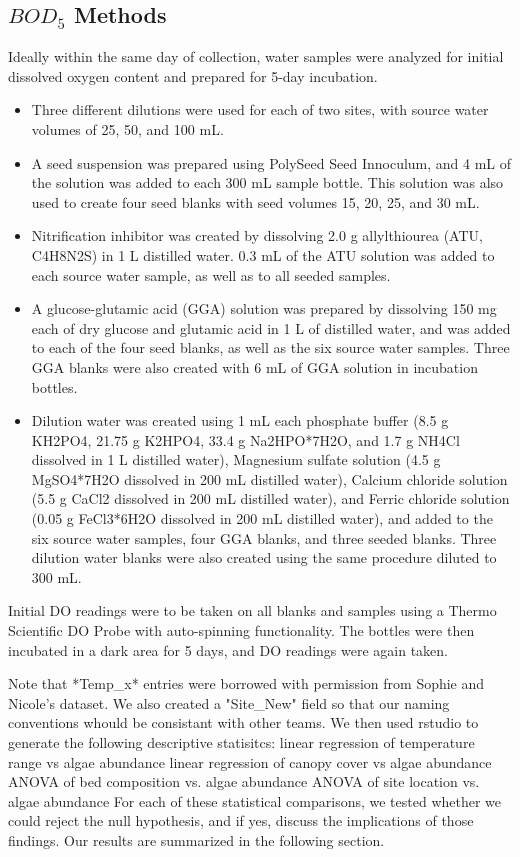 \documentclass{article}\usepackage[]{graphicx}\usepackage[]{color}
\begin{document}
\subsection{$BOD_5$ Methods}

Ideally within the same day of collection, water samples were analyzed for initial dissolved oxygen content and prepared for 5-day incubation.  
\begin{itemize}
  \item Three different dilutions were used for each of two sites, with source water volumes of 25, 50, and 100 mL. 
  \item A seed suspension was prepared using PolySeed Seed Innoculum, and 4 mL of the solution was added to each 300 mL sample bottle. This solution was also used to create four seed blanks with seed volumes 15, 20, 25, and 30 mL.
  \item Nitrification inhibitor was created by dissolving 2.0 g allylthiourea (ATU, C4H8N2S) in 1 L distilled water. 0.3 mL of the ATU solution was added to each source water sample, as well as to all seeded samples. 
  \item A glucose-glutamic acid (GGA) solution was prepared by dissolving 150 mg each of dry glucose and glutamic acid in 1 L of distilled water, and was added to each of the four seed blanks, as well as the six source water samples. Three GGA blanks were also created with 6 mL of GGA solution in incubation bottles. 
  \item Dilution water was created using 1 mL each phosphate buffer (8.5 g KH2PO4, 21.75 g K2HPO4, 33.4 g Na2HPO*7H2O, and 1.7 g NH4Cl dissolved in 1 L distilled water), Magnesium sulfate solution (4.5 g MgSO4*7H2O dissolved in 200 mL distilled water), Calcium chloride solution (5.5 g CaCl2 dissolved in 200 mL distilled water), and Ferric chloride solution (0.05 g FeCl3*6H2O dissolved in 200 mL distilled water), and added to the six source water samples, four GGA blanks, and three seeded blanks. Three dilution water blanks were also created using the same procedure diluted to 300 mL.
\end{itemize}
Initial DO readings were to be taken on all blanks and samples using a Thermo Scientific DO Probe with auto-spinning functionality. The bottles were then incubated in a dark area for 5 days, and DO readings were again taken.  

Note that *Temp\_x* entries were borrowed with permission from Sophie and Nicole's dataset. We also created a "Site\_New" field so that our naming conventions whould be consistant with other teams. We then used rstudio to generate the following descriptive statisitcs:  
linear regression of temperature range vs algae abundance
linear regression of canopy cover vs algae abundance
ANOVA of bed composition vs. algae abundance
ANOVA of site location vs. algae abundance
For each of these statistical comparisons, we tested whether we could reject the null hypothesis, and if yes, discuss the implications of those findings. Our results are summarized in the following section. 
\end{document}
